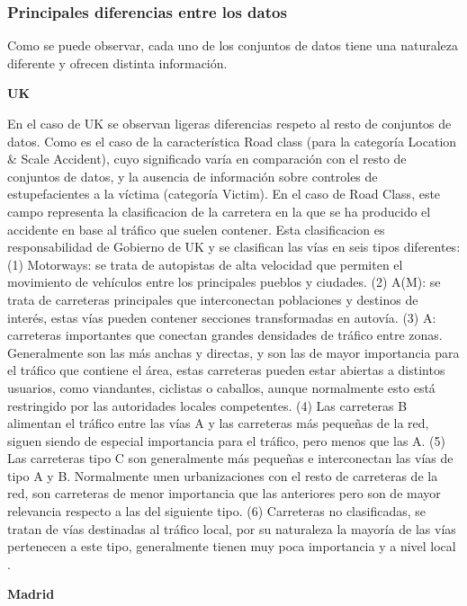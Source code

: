 \documentclass{uathesis-es}
\begin{document}
{\subsubsection{Principales diferencias entre los datos}

Como se puede observar, cada uno de los conjuntos de datos tiene una naturaleza diferente y ofrecen distinta información.

\textbf{UK}

En el caso de UK se observan ligeras diferencias respeto al resto de conjuntos de datos. Como es el caso de la característica Road class (para la categoría Location \& Scale Accident), cuyo significado varía en comparación con el resto de conjuntos de datos, y la ausencia de información sobre controles de estupefacientes a la víctima (categoría Victim). En el caso de Road Class, este campo representa la clasificacion de la carretera en la que se ha producido el accidente en base al tráfico que suelen contener. Esta clasificacion es responsabilidad de Gobierno de UK y se clasifican las vías en seis tipos diferentes: (1) Motorways: se trata de autopistas de alta velocidad que permiten el movimiento de vehículos entre los principales pueblos y ciudades. (2) A(M): se trata de carreteras principales que interconectan poblaciones y destinos de interés, estas vías pueden contener secciones transformadas en autovía. (3) A: carreteras importantes que conectan grandes densidades de tráfico entre zonas. Generalmente son las más anchas y directas, y son las de mayor importancia para el tráfico que contiene el área, estas carreteras pueden estar abiertas a distintos usuarios, como viandantes, ciclistas o caballos, aunque normalmente esto está restringido por las autoridades locales competentes. (4) Las carreteras B alimentan el tráfico entre las vías A y las carreteras más pequeñas de la red, siguen siendo de especial importancia para el tráfico, pero menos que las A. (5) Las carreteras tipo C son generalmente más pequeñas e interconectan las vías de tipo A y B. Normalmente unen urbanizaciones con el resto de carreteras de la red, son carreteras de menor importancia que las anteriores pero son de mayor relevancia respecto a las del siguiente tipo. (6) Carreteras no clasificadas, se tratan de vías destinadas al tráfico local, por su naturaleza la mayoría de las vías pertenecen a este tipo, generalmente tienen muy poca importancia y a nivel local \cite{UKDepartmentForTransportRoadClassification}.


\textbf{Madrid}

}
\end{document}
